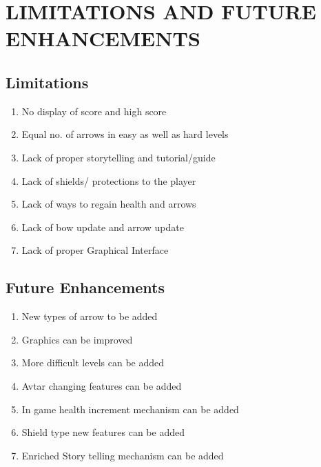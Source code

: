 \section{LIMITATIONS AND FUTURE ENHANCEMENTS}

\subsection{Limitations}
\begin{enumerate}
	\item No display of score and high score
	\item Equal no. of arrows in easy as well as hard levels
	\item Lack of proper storytelling and tutorial/guide
	\item Lack of shields/ protections to the player
	\item Lack of ways to regain health and arrows
	\item Lack of bow update and arrow update
	\item Lack of proper Graphical Interface
\end{enumerate}

\subsection{Future Enhancements}
\begin{enumerate}
	\item New types of arrow to be added 
	\item Graphics can be improved 
	\item More difficult levels can be added 
	\item Avtar changing features can be added 
	\item  In game health increment mechanism can be added
	\item Shield type new features can be added
	\item Enriched Story telling mechanism can be added
\end{enumerate}


\newpage
